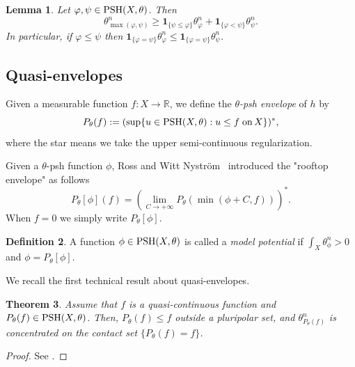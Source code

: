 \documentclass[a4paper]{amsart}
\numberwithin{equation}{section}
\newtheorem{theorem}{Theorem}[section]
\newtheorem{lemma}[theorem]{Lemma}
\theoremstyle{definition}
\newtheorem{definition}[theorem]{Definition}
\numberwithin{equation}{section}
\newcommand{\PSH}{{\rm PSH}}
\begin{document}
\begin{lemma}\label{lem: maxprin}
	Let $\varphi,\psi\in\PSH(X,\theta)$. Then
	\[\theta_{\max(\varphi,\psi)}^n\geq \mathbf{1}_{\{\psi\leq\varphi \}}\theta_\varphi^n+\mathbf{1}_{\{\varphi<\psi\}}\theta_{\psi}^n. \]
    In particular, if $\varphi\leq\psi$ then $\mathbf{1}_{\{\varphi=\psi\}}\theta^n_\varphi\leq \mathbf{1}_{\{\varphi=\psi\}}\theta^n_\psi$.
\end{lemma}

\subsection{Quasi-envelopes}
Given a measurable function $f:X\to\mathbb{R}$, we define the {\em $\theta$-psh envelope} of $h$ by
\begin{equation*}
P_\theta(f):=(\sup\{u\in\PSH(X,\theta): u\leq f\;\text{on}\, X \})^*,
\end{equation*} where the star means we take the upper semi-continuous regularization. %

Given a $\theta$-psh function $\phi$, 
Ross and Witt Nystr\"om~\cite{ross2014analytic} introduced the "rooftop envelope" as follows
\[P_\theta[\phi](f)= \left( \lim_{C\to +\infty}P_\theta(\min(\phi+C,f))\right)^*. \]
When $f=0$ we simply write $P_\theta[\phi]$. 
\begin{definition}
A function $\phi\in\PSH(X,\theta)$ is called a {\em model potential} if $\int_X\theta_\phi^n>0$ and $\phi=P_\theta[\phi]$.
\end{definition}
We recall the first technical result about quasi-envelopes. 
\begin{theorem} \label{thm: envelope}
	Assume that $f$ is a quasi-continuous function and $P_\theta(f)\in\PSH(X,\theta)$. Then, $P_\theta(f)\leq f$ outside a pluripolar set, and $\theta_{P_\theta(f)}^n$ is concentrated
	on the contact set $\{P_\theta(f)=f \}$.
\end{theorem}
\begin{proof}
 See \cite[Theorem 2.2]{darvas2023relative}.
\end{proof}
\end{document}
